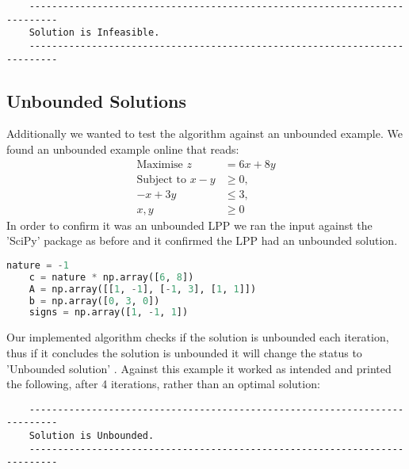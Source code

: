 \documentclass{article}
\numberwithin{equation}{section}
\begin{document}
\begin{lstlisting}
    ---------------------------------------------------------------------------
    Solution is Infeasible.
    ---------------------------------------------------------------------------
\end{lstlisting}
\newpage
\subsection{Unbounded Solutions}
Additionally we wanted to test the algorithm against an unbounded example. We found an unbounded example online that reads:
\begin{align}
    \text{Maximise }z &= 6x + 8y \\
    \text{Subject to }x - y &\geq 0, \\
    -x + 3y &\leq 3, \\
    x, y &\geq 0
\end{align}
In order to confirm it was an unbounded LPP we ran the input against the 'SciPy' package as before and it confirmed the LPP had an unbounded solution.
\begin{lstlisting}[language=Python, basicstyle=\scriptsize, frame=single]
    nature = -1                                            
    c = nature * np.array([6, 8])
    A = np.array([[1, -1], [-1, 3], [1, 1]])
    b = np.array([0, 3, 0])
    signs = np.array([1, -1, 1]) 
\end{lstlisting}
Our implemented algorithm checks if the solution is unbounded each iteration, thus if it concludes the solution is unbounded it will change the status to 'Unbounded solution' .
Against this example it worked as intended and printed the following, after 4 iterations, rather than an optimal solution:
\begin{lstlisting}
    ---------------------------------------------------------------------------
    Solution is Unbounded.
    ---------------------------------------------------------------------------
\end{lstlisting}
\newpage
\end{document}
